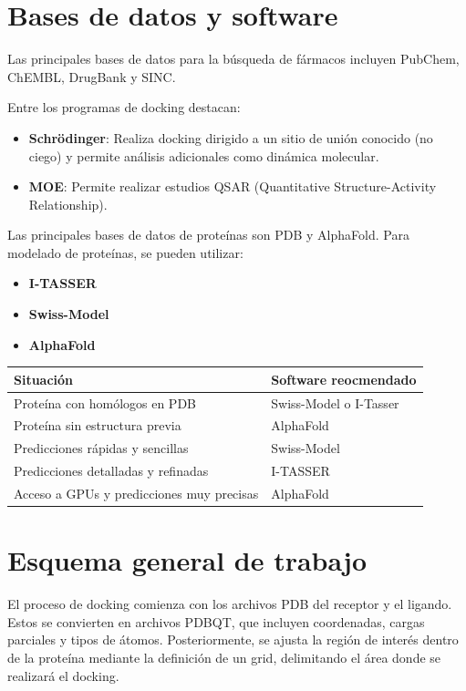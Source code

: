 \section{Bases de datos y software}
Las principales bases de datos para la búsqueda de fármacos incluyen PubChem, ChEMBL, DrugBank y SINC.

Entre los programas de docking destacan:
\begin{itemize}
\item \textbf{Schrödinger}: Realiza docking dirigido a un sitio de unión conocido (no ciego) y permite análisis adicionales como dinámica molecular.
\item \textbf{MOE}: Permite realizar estudios QSAR (Quantitative Structure-Activity Relationship).
\end{itemize}

Las principales bases de datos de proteínas son PDB y AlphaFold. Para modelado de proteínas, se pueden utilizar:
\begin{itemize}
\item \textbf{I-TASSER}
\item \textbf{Swiss-Model}
\item \textbf{AlphaFold}
\end{itemize}

\begin{table}[h]
\centering
\begin{tabular}{l l}
Situación & Software reocmendado \\ \hline
Proteína con homólogos en PDB & Swiss-Model o I-Tasser \\
Proteína sin estructura previa & AlphaFold \\
Predicciones rápidas y sencillas & Swiss-Model \\
Predicciones detalladas y refinadas & I-TASSER \\
Acceso a GPUs y predicciones muy precisas & AlphaFold
\end{tabular}
\end{table}

\section{Esquema general de trabajo}
El proceso de docking comienza con los archivos PDB del receptor y el ligando. Estos se convierten en archivos PDBQT, que incluyen coordenadas, cargas parciales y tipos de átomos. Posteriormente, se ajusta la región de interés dentro de la proteína mediante la definición de un grid, delimitando el área donde se realizará el docking.

